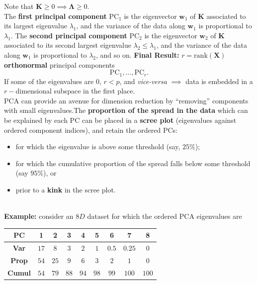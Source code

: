 \documentclass[20pt,landscape,footrule,headrule]{foils}
\newcommand{\newl}{\newline\newline}
\begin{document}
{{Note that $\mathbf{K}\geq 0 \implies \mathbf{\Lambda} \geq 0$. 
\newpage\ \\ \noindent The \textbf{first principal component} $\textrm{PC}_1$ is the eigenvector $\mathbf{w}_1$ of $\mathbf{K}$ associated to its largest eigenvalue $\lambda_1$, and the variance of the data along $\mathbf{w}_1$ is proportional to $\lambda_1$.
\newl The \textbf{second principal component} $\textrm{PC}_2$ is the eigenvector $\mathbf{w}_2$ of $\mathbf{K}$ associated to its second  largest eigenvalue $\lambda_2\leq \lambda_1$, and the variance of the data along $\mathbf{w}_1$ is proportional to $\lambda_2$, and so on.
\newl \textbf{Final Result:} $r=\textrm{rank}(\mathbf{X})$ \textbf{orthonormal} principal components $$\textrm{PC}_1,\ldots,\textrm{PC}_r.$$ 
If some of the eigenvalues are $0$, $r<p$, and \textit{vice-versa} $\implies$ data is embedded in a $r-$dimensional subspace in the first place. \newpage\ \\ \noindent  PCA can provide an avenue for dimension reduction by ``removing'' components with small eigenvalues.\newl The \textbf{proportion of the spread in the data} which can be explained by each PC can be placed in a \textbf{scree plot} (eigenvalues against ordered component indices), and retain the ordered PCs:
\begin{itemize} 
\item for which the eigenvalue is above some threshold (say, $25\%$);  
\item for which the cumulative proportion of the spread falls below some threshold (say $95\%$), or 
\item prior to a \textbf{kink} in the scree plot.
\end{itemize}
\newpage\ \\ \noindent \textbf{Example:} consider an $8D$ dataset for which the ordered PCA eigenvalues are 
\begin{center}%
\begin{tabular}{ccccccccc}
\textbf{PC}           & \textbf{1} & \textbf{2} & \textbf{3} & \textbf{4} & \textbf{5} & \textbf{6} & \textbf{7} & \textbf{8} \\ \hline
\textbf{Var}     & $17$       & $8$        & $3$        & $2$        & $1$        & $0.5$        & $0.25$        & $0$        \\
\textbf{Prop}   & $54$       & $25$       & $9$       & $6$       & $3$       & $2$       & $1$       & $0$       \\
\textbf{Cumul} & $54$       & $79$       & $88$       & $94$       & $98$       & $99$       & $100$       & $100$      

\end{tabular}
\end{center}}}
\end{document}
